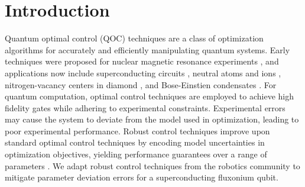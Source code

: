\section{Introduction}
Quantum optimal control (QOC) techniques are a class of optimization
algorithms for accurately and efficiently manipulating quantum systems.
Early techniques were proposed for nuclear magnetic resonance experiments
\cite{vandersypen2005nmr, kehlet2004improving, khaneja2005optimal,
  maximov2008optimal, nielsen2010optimal, skinner2003application, tosner2009optimal},
and applications now include superconducting circuits \cite{abdelhafez2020universal,
  chakram2020multimode, fisher2010optimal, gokhale2019partial,
  huang2020engineering, leng2019robust, leung2017speedup, li2020fast,
  xu2020nonadiabatic},
neutral atoms and ions \cite{brouzos2015quantum,
  de2008optimal, goerz2011quantum, guo2019high, jensen2019time,
  larrouy2020fast, omran2019generation, rosi2013fast, sorensen2019qengine,
  treutlein2006microwave, van2016optimal},
nitrogen-vacancy centers in diamond \cite{chou2015optimal,
  dolde2014high, geng2016experimental,
  nobauer2015smooth, poggiali2018optimal, rembold2020introduction, tian2019optimal},
and Bose-Einstien condensates \cite{amri2019optimal, sorensen2018quantum}.
For quantum computation,
optimal control techniques are employed to achieve high fidelity gates
while adhering to experimental constraints.
Experimental errors may cause the system to deviate
from the model used in optimization, leading
to poor experimental performance.
Robust control techniques improve upon
standard optimal control techniques by encoding
model uncertainties
in optimization objectives, yielding performance
guarantees over a range of parameters \cite{Zhou97,Morimoto00,Manchester18}.
We adapt robust control techniques from the robotics community to mitigate
parameter deviation errors for
a superconducting fluxonium qubit.

